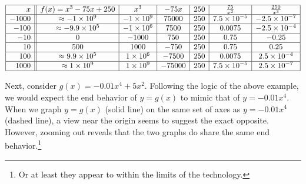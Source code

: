 \documentclass{ximera}
\begin{document}
\[ \begin{array}{|r||c|c|c|c|c|c|}  \hline

 x &  f(x) = x^3 -75x+250 &  x^3 & -75 x & 250 & \frac{75}{x^2} &  \frac{250}{x^3}  \\ \hline
 -1000 & \approx -1 \times 10^9  &   -1 \times 10^9 &75000  & 250 & 7.5 \times 10^{-5} & -2.5 \times 10^{-7} \\  \hline
 -100 & \approx -9.9 \times 10^5 & -1 \times 10^6 & 7500  & 250 & 0.0075 & -2.5 \times 10^{-4} \\  \hline
 -10 & 0  & -1000  & 750 & 250  & 0.75   & -0.25\\  \hline
 10 & 500 &  1000 &  -750 & 250   & 0.75  &  0.25   \\ \hline
 100 &\approx 9.9 \times 10^5  & 1 \times 10^6 &   -7500  & 250 &  0.0075 &   2.5 \times 10^{-4} \\ \hline
 1000 & \approx 1 \times 10^9 & 1 \times 10^9  & -75000 & 250 & 7.5 \times 10^{-5} & 2.5 \times 10^{-7} \\  \hline

\end{array} \]


Next, consider  $g(x) = -0.01x^4 + 5x^2$.  Following the logic of the above example, we would expect the end behavior of $y=g(x)$ to mimic that of $y = -0.01 x^4$.  When we graph $y = g(x)$ (solid line) on the same set of axes as $y = -0.01x^4$ (dashed line), a view near the origin seems to suggest the exact opposite.  However, zooming out reveals that the two graphs do share the same end behavior.\footnote{Or at least they appear to within the limits of the technology.}
\end{document}
